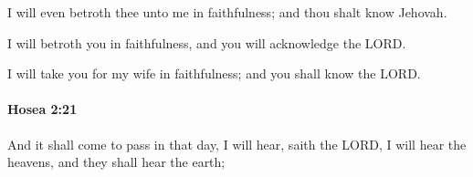 			\begin{versebox}
					\item[BHS] 
					\item[LXX] 
					\item[ASV] I will even betroth thee unto me in faithfulness; and thou shalt know Jehovah.
					\item[NIV] I will betroth you in faithfulness, and you will acknowledge the LORD.
					\item[NRSV] I will take you for my wife in faithfulness; and you shall know the LORD.
			\end{versebox}

		\paragraph{Hosea 2:21} %
			\label{HOSEA-2-21}

			And it shall come to pass in that day, I will hear, saith the LORD, I will hear the heavens, and they shall hear the earth;


